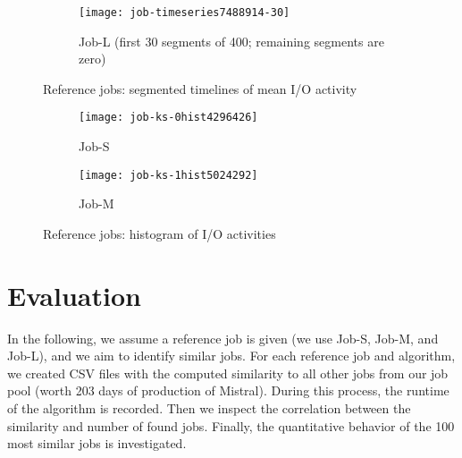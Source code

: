 \documentclass{jhps}
\begin{document}
\begin{figure}\ContinuedFloat%

\begin{subfigure}{0.8\textwidth}
\centering
\texttt{[image: job-timeseries7488914-30]}
\caption{Job-L (first 30 segments of 400; remaining segments are zero)}%
\label{fig:job-L}
\end{subfigure}
\centering
\caption{Reference jobs: segmented timelines of mean I/O activity}
\end{figure}


\begin{figure}
\begin{subfigure}{0.49\textwidth} %
\centering
\texttt{[image: job-ks-0hist4296426]}
\caption{Job-S}\label{fig:job-S-hist}
\end{subfigure}
\centering
\begin{subfigure}{0.49\textwidth}
\centering
\texttt{[image: job-ks-1hist5024292]}
\caption{Job-M}\label{fig:job-M-hist}
\end{subfigure}
\centering


\caption{Reference jobs: histogram of I/O activities}%
\label{fig:refJobsHist}
\end{figure}




\section{Evaluation}%
\label{sec:evaluation}

In the following, we assume a reference job is given (we use Job-S, Job-M, and Job-L), and we aim to identify similar jobs.
For each reference job and algorithm, we created CSV files with the computed similarity to all other jobs from our job pool (worth 203 days of production of Mistral).
During this process, the runtime of the algorithm is recorded.
Then we inspect the correlation between the similarity and number of found jobs.
Finally, the quantitative behavior of the 100 most similar jobs is investigated.
\end{document}
